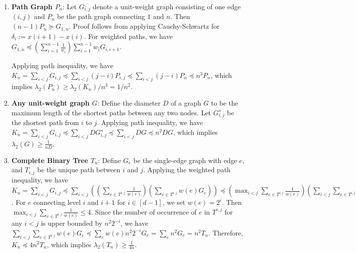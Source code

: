 \begin{enumerate}

    \item \textbf{Path Graph $P_n$}: Let $G_{i,j}$ denote a unit-weight graph consisting of one edge $(i,j)$ and $P_n$ be the path graph connecting $1$ and $n$. Then $(n-1)P_n \succeq G_{1,n}$. Proof follows from applying Cauchy-Schwartz for $\delta_i:=x(i+1)-x(i)$. For weighted paths, we have $G_{1, n} \preceq\left(\sum_{i=1}^{n-1} \frac{1}{w_{i}}\right) \sum_{i=1}^{n-1} w_{i} G_{i, i+1}$.

    Applying path inequality, we have $K_n = \sum_{i<j} G_{i,j} \preceq \sum_{i<j} (j-i) P_{i,j} \preceq \sum_{i<j} (j-i) P_n \preceq n^3 P_n$, which implies $\lambda_2(P_n) \ge \lambda_2(K_n)/n^3 = 1/n^2$.



    \item \textbf{Any unit-weight graph $G$}: Define the diameter $D$ of a graph $G$ to be the maximum length of the shortest paths between any two nodes. Let $G^s_{i,j}$ be the shortest path from $i$ to $j$. Applying path inequality, we have $K_n = \sum_{i<j} G_{i,j} \preceq \sum_{i<j} D G^s_{i,j} \preceq \sum_{i<j} DG \preceq n^2 DG$, which implies $\lambda_2(G) \ge \frac{1}{nD}$.

    \item \textbf{Complete Binary Tree $T_n$}: Define $G_e$ be the single-edge graph with edge $e$, and $T_{i,j}$ be the unique path between $i$ and $j$. Applying the weighted path inequality, we have $K_n = \sum_{i<j} G_{i,j} \preceq \sum_{i<j}\left(\left(\sum_{e \in T^{i, j}} \frac{1}{w(e)}\right)\left(\sum_{e \in T^{i, j}} w(e) G_{e}\right)\right) \preceq\left(\max _{i<j} \sum_{e \in T^{i, j}} \frac{1}{w(e)}\right)\left(\sum_{i<j} \sum_{e \in T^{i, j}} w(e) G_{e}\right)$. For $e$ connecting level $i$ and $i+1$ for $i \in [d-1]$, we set $w(e)=2^i$. Then $\max _{i<j} \sum_{e \in T^{i, j}} \frac{1}{w(e)} \le 4$. Since the number of occurrence of $e$ in $T^{i,j}$ for any $i<j$ is upper bounded by $n^2 2^{-i}$, we have $\sum_{i<j} \sum_{e \in T^{i, j}} w(e) G_{e} \preceq \sum_{e} w(e) n^2 2^{-i} G_e = \sum_e n^2 G_e = n^2T_n$. Therefore, $K_n \preceq 4n^2T_n$, which implies $\lambda_2(T_n) \ge \frac{1}{4n}$.
    
\end{enumerate}


